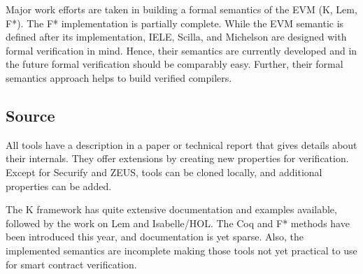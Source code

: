 Major work efforts are taken in building a formal semantics of the EVM (K, Lem, F*). 
The F* implementation is partially complete. While the EVM semantic is defined after its implementation, IELE, Scilla, and Michelson are designed with formal verification in mind. Hence, their semantics are currently developed and in the future formal verification should be comparably easy. Further, their formal semantics approach helps to build verified compilers.

\subsection{Source} 
All tools have a description in a paper or technical report that gives details about their internals. They offer extensions by creating new properties for verification. Except for Securify and ZEUS, tools can be cloned locally, and additional properties can be added.

The K framework has quite extensive documentation and examples available, followed by the work on Lem and Isabelle/HOL. The Coq and F* methods have been introduced this year, and documentation is yet sparse. Also, the implemented semantics are incomplete making those tools not yet practical to use for smart contract verification.
